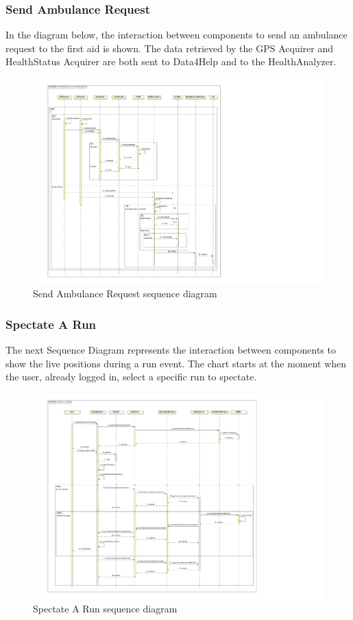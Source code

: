 \subsubsection{Send Ambulance Request}
In the diagram below, the interaction between components to send an ambulance request to the first aid is shown. The data retrieved by the GPS Acquirer and HealthStatus Acquirer are both sent to Data4Help and to the HealthAnalyzer.
\\[0.5cm]
\begin{figure}[H]
\centering
\includegraphics[scale=0.93, angle=0,origin=c]{Images/SequenceDiagrams/SendAmbulance.pdf}
\caption{Send Ambulance Request sequence diagram}
\clearpage
\end{figure}
\newpage
\subsubsection{Spectate A Run}
The next Sequence Diagram represents the interaction between components to show the live positions during a run event. The chart starts at the moment when the user, already logged in, select a specific run to spectate.
\\[1.0cm]
\begin{figure}[H]
\centering
\includegraphics[scale=0.8, angle=0,origin=c]{Images/SequenceDiagrams/SpectateRun.pdf}
\caption{Spectate A Run sequence diagram}
\end{figure}
\clearpage


